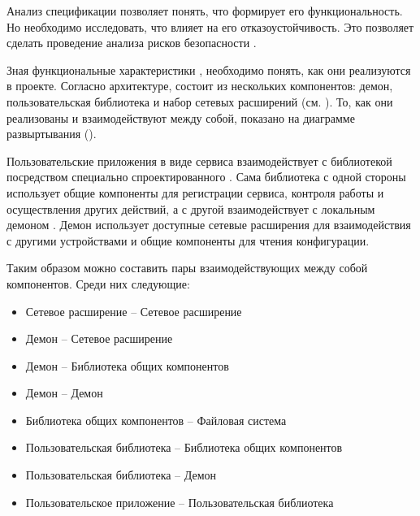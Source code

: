 %
Анализ спецификации  позволяет понять, что формирует его функциональность. 
%
Но необходимо исследовать, что влияет на его отказоустойчивость. 
%
Это позволяет сделать проведение анализа рисков безопасности . 

%
Зная функциональные характеристики , необходимо понять, как они реализуются в проекте. 
%
Согласно архитектуре,  состоит из нескольких компонентов: демон, пользовательская библиотека и набор сетевых расширений (см. ).
%
То, как они реализованы и взаимодействуют между собой, показано на диаграмме развыртывания  (). 


%
Пользовательские приложения в виде сервиса взаимодействует с библиотекой  посредством специально спроектированного .
%
Сама библиотека с одной стороны использует общие компоненты для регистрации сервиса, контроля работы  и осуществления других действий, а с другой взаимодействует с локальным демоном .
%
Демон  использует доступные сетевые расширения для взаимодействия с другими устройствами и общие компоненты для чтения конфигурации. 

%
Таким образом можно составить пары взаимодействующих между собой компонентов.
%
Среди них следующие:
\begin{itemize}
	\setlength{\itemsep}{0pt}%

	\item Сетевое расширение -- Сетевое расширение
	\item Демон -- Сетевое расширение
	\item Демон -- Библиотека общих компонентов
	\item Демон -- Демон
	\item Библиотека общих компонентов -- Файловая система
	\item Пользовательская библиотека -- Библиотека общих компонентов
	\item Пользовательская библиотека -- Демон
	\item Пользовательское приложение -- Пользовательская библиотека
\end{itemize}

